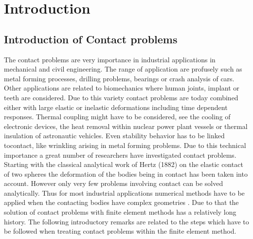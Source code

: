 
\chapter{Introduction} %

\label{Chapter1} %


\newcommand{\keyword}[1]{\textbf{#1}}
\newcommand{\tabhead}[1]{\textbf{#1}}
\newcommand{\code}[1]{\texttt{#1}}
\newcommand{\file}[1]{\texttt{\bfseries#1}}
\newcommand{\option}[1]{\texttt{\itshape#1}}


\section{Introduction of Contact problems}
The contact problems are very importance in industrial applications in mechanical and civil engineering. The range of application are profusely such as metal forming processes, drilling problems, bearings or crash analysis of cars. Other applications are related to biomechanics where human joints, implant or teeth are considered. Due to this variety contact problems are today combined either with large elastic or inelastic deformations
including time dependent responses. Thermal coupling might have to be considered, see the cooling of electronic devices, the heat removal within nuclear power plant vessels or
thermal insulation of astronautic vehicles. Even stability behavior has to be linked tocontact, like wrinkling arising in metal forming problems. \parencite{ref1} Due to this technical importance a great number of researchers have investigated contact
problems. Starting with the classical analytical work of Hertz (1882) on the elastic contact of two spheres the deformation of the bodies being in contact has been taken into account. However only very few problems involving contact can be solved analytically. Thus for
most industrial applications numerical methods have to be applied when the contacting bodies have complex geometries . Due to that the solution of contact problems with finite
element methods has a relatively long history. \parencite{ref1}
The following introductory remarks are related to the steps which have to be followed when
treating contact problems within the finite element method. \parencite{ref1}


